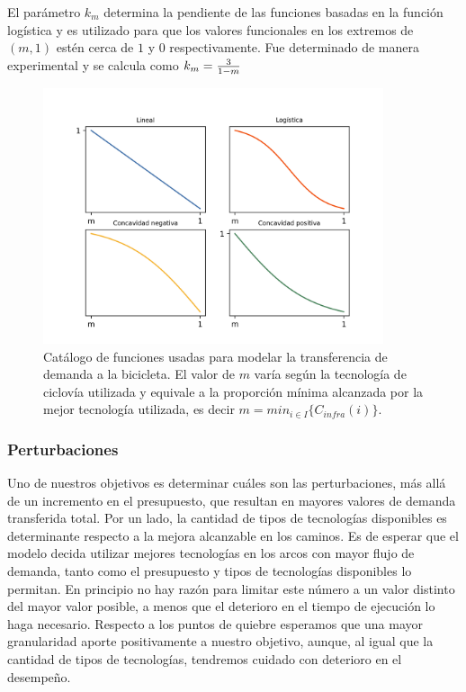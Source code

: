 \documentclass{article}
\begin{document}
  El parámetro $k_m$ determina la pendiente de las funciones basadas en la función logística y es utilizado para que los valores funcionales en los extremos de $(m, 1)$ estén cerca de $1$ y $0$ respectivamente. Fue determinado de manera experimental y se calcula como $k_m = {3 \over 1 - m}$

  \begin{figure}[h!]
    \centering
    \includegraphics[width=10cm]{../resources/f_catalog.png}
      \caption{Catálogo de funciones usadas para modelar la transferencia de demanda a la bicicleta. El valor de $m$ varía según la tecnología de ciclovía utilizada y equivale a la proporción mínima alcanzada por la mejor tecnología utilizada, es decir $m = min_{i \in I} \{ C_{infra}(i) \}$.}
    \label{fig:fcatalog}
  \end{figure}

  \FloatBarrier
  \subsubsection{Perturbaciones}

  Uno de nuestros objetivos es determinar cuáles son las perturbaciones, más allá de un incremento en el presupuesto, que resultan en mayores valores de demanda transferida total. Por un lado, la cantidad de tipos de tecnologías disponibles es determinante respecto a la mejora alcanzable en los caminos. Es de esperar que el modelo decida utilizar mejores tecnologías en los arcos con mayor flujo de demanda, tanto como el presupuesto y tipos de tecnologías disponibles lo permitan. En principio no hay razón para limitar este número a un valor distinto del mayor valor posible, a menos que el deterioro en el tiempo de ejecución lo haga necesario. Respecto a los puntos de quiebre esperamos que una mayor granularidad aporte positivamente a nuestro objetivo, aunque, al igual que la cantidad de tipos de tecnologías, tendremos cuidado con deterioro en el desempeño.
\end{document}
